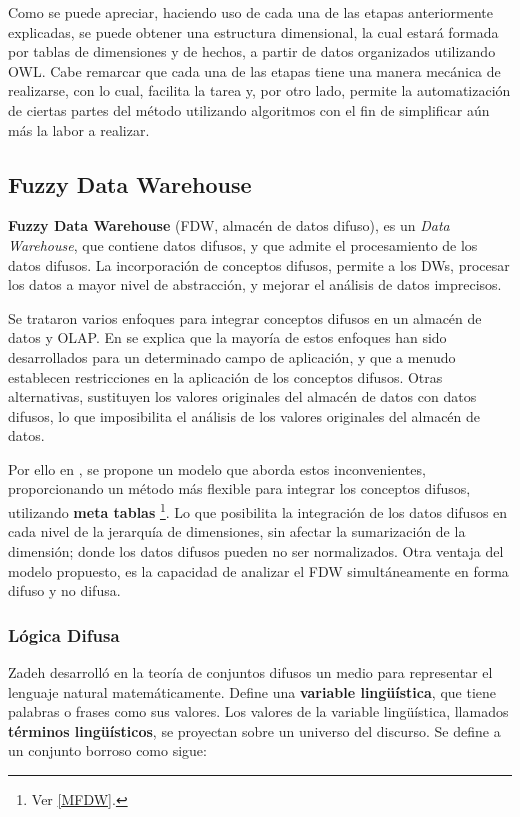 \documentclass[a4paper,11pt]{article}
\begin{document}
    
    Como se puede apreciar, haciendo uso de cada una de las etapas anteriormente explicadas, se puede obtener una estructura dimensional, la cual estará
    formada por tablas de dimensiones y de hechos, a partir de datos organizados utilizando OWL. Cabe remarcar que cada una de las etapas tiene una manera
    mecánica de realizarse, con lo cual, facilita la tarea y, por otro lado, permite la automatización de ciertas partes del método utilizando algoritmos con el
    fin de simplificar aún más la labor a realizar.
    
    \subsection{Fuzzy Data Warehouse}
    
    \textbf{Fuzzy Data Warehouse} (FDW, almacén de datos difuso), es un \textit{Data Warehouse}, que contiene datos difusos, y que admite el procesamiento
    de los datos difusos.
    La incorporación de conceptos difusos, permite a los DWs, procesar los datos a mayor nivel de abstracción, y mejorar el análisis de datos imprecisos.
    
    Se trataron varios enfoques para integrar conceptos difusos en un almacén de datos y OLAP. 
    En \cite{Fasel14} se explica que la mayoría de estos enfoques han sido desarrollados para un determinado campo de aplicación, y que a menudo establecen
    restricciones en la aplicación de los conceptos difusos.
    Otras alternativas, sustituyen los valores originales del almacén de datos con datos difusos, lo que imposibilita el análisis de los valores originales del
    almacén de datos.
    
    Por ello en \cite{Fasel14}, se propone un modelo que aborda estos inconvenientes, proporcionando un método más flexible para integrar los conceptos difusos,
    utilizando \textbf{meta tablas} \footnote{Ver \ref{MFDW}.}.
    Lo que posibilita la integración de los datos difusos en cada nivel de la jerarquía de dimensiones, sin afectar la sumarización de la dimensión; donde los datos
    difusos pueden no ser normalizados. 
    Otra ventaja del modelo propuesto, es la capacidad de analizar el FDW simultáneamente en forma difuso y no difusa.
    
    \subsubsection{Lógica Difusa}
    
    Zadeh desarrolló en la teoría de conjuntos difusos un medio para representar el lenguaje natural matemáticamente. Define una \textbf{variable lingüística}, que tiene 
    palabras o frases como sus valores. Los valores de la variable lingüística, llamados \textbf{términos lingüísticos}, se proyectan sobre un universo del discurso.
    Se define a un conjunto borroso como sigue:
        
\end{document}
